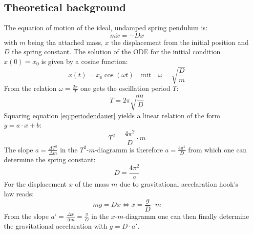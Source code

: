 \subsection{Theoretical background}
The equation of motion of the ideal, undamped spring pendulum is:
\begin{equation}
    m \ddot{x} = -D x
    \label{eq:dgl}
\end{equation}
with $m$ being tha attached mass, $x$ the displacement from the initial position and $D$ the spring constant. The solution of the ODE for the initial condition $x(0)= x_0$ is given by a cosine function:
\begin{equation}
    x(t) = x_0 \cos(\omega t) \quad \text{mit} \quad \omega = \sqrt{\frac{D}{m}}
    \label{eq:loesung}
\end{equation}
From the relation $\omega = \frac{2\pi}{T}$ one gets the oscillation period $T$:
\begin{equation}
    T = 2\pi \sqrt{\frac{m}{D}}
    \label{eq:periodendauer}
\end{equation}
Squaring equation \ref{eq:periodendauer} yields a linear relation of the form $y = a \cdot x + b$:
\begin{equation}
    T^2 = \frac{4\pi^2}{D} \cdot m
    \label{eq:t_quadrat}
\end{equation}
The slope $a = \frac{\Delta T^2}{\Delta m}$ in the $T^2$-$m$-diagramm is therefore $a = \frac{4 \pi^2}{D}$ from which one can determine the spring constant:
\begin{equation}
    D = \frac{4\pi^2}{a}
    \label{eq:federkonstante}
\end{equation}
For the displacement $x$ of the mass $m$ due to gravitational accelaration hook's law reads:
\begin{equation}
    m g = D x \iff x = \frac{g}{D} \cdot m
    \label{eq:statisch}
\end{equation}
From the slope $a' = \frac{\Delta x}{\Delta m} = \frac{g}{D}$ in the $x$-$m$-diagramm one can then finally determine the gravitational accelaration with $g = D \cdot a'$.
